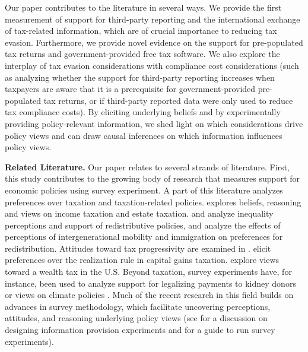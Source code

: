 \documentclass[12pt]{article}
\begin{document}

Our paper contributes to the literature in several ways. We provide the first measurement of support for third-party reporting and the international exchange of tax-related information, which are of crucial importance to reducing tax evasion. Furthermore, we provide novel evidence on the support for pre-populated tax returns and government-provided free tax software. We also explore the interplay of tax evasion considerations with compliance cost considerations (such as analyzing whether the support for third-party reporting increases when taxpayers are aware that it is a prerequisite for government-provided pre-populated tax returns, or if third-party reported data were only used to reduce tax compliance costs). By eliciting underlying beliefs and by experimentally providing policy-relevant information, we shed light on which considerations drive policy views and can draw causal inferences on which information influences policy views.



\textbf{Related Literature.}
Our paper relates to several strands of literature. First, this study contributes to the growing body of research that measures support for economic policies using survey experiment. A part of this literature analyzes preferences over taxation and taxation-related policies. \textcite{stantcheva2021understanding} explores beliefs, reasoning and views on income taxation and estate taxation. \textcite{cruces2013biased} and \textcite{kuziemko2015elastic} analyze inequality perceptions and support of redistributive policies, \textcite{alesina2018intergenerational} and \textcite{alesina2023immigration} analyze the effects of perceptions of intergenerational mobility and immigration on preferences for redistribution. Attitudes toward tax progressivity are examined in \textcite{tarroux2019value}. \textcite{liscow2022psychology} elicit preferences over the realization rule in capital gains taxation. \textcite{fisman2020americans} explore views toward a wealth tax in the U.S. Beyond taxation, survey experiments have, for instance, been used to analyze support for legalizing payments to kidney donors \parencite{elias2019paying} or views on climate policies \parencite{dechezlepretre2025fighting}. Much of the recent research in this field builds on advances in survey methodology, which facilitate uncovering perceptions, attitudes, and reasoning underlying policy views (see \textcite{haaland2023designing} for a discussion on designing information provision experiments and \textcite{stantcheva2023run} for a guide to run survey experiments). 
\end{document}
